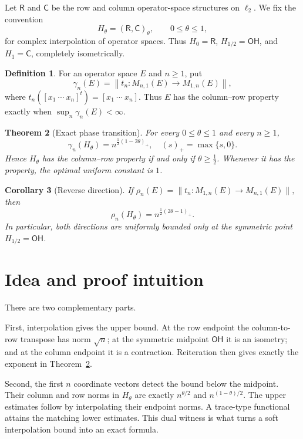 \documentclass[11pt]{article}
\newtheorem{theorem}{Theorem}
\newtheorem{corollary}[theorem]{Corollary}
\theoremstyle{definition}
\newtheorem{definition}[theorem]{Definition}
\newcommand{\Rspace}{\mathsf R}
\newcommand{\Cspace}{\mathsf C}
\newcommand{\OH}{\mathsf{OH}}
\begin{document}
Let \(\Rspace\) and \(\Cspace\) be the row and column operator-space structures
on \(\ell_2\).  We fix the convention
\[
 H_\theta=(\Rspace,\Cspace)_\theta,
 \qquad 0\leq\theta\leq1,
\]
for complex interpolation of operator spaces.  Thus
\(H_0=\Rspace\), \(H_{1/2}=\OH\), and \(H_1=\Cspace\), completely isometrically.

\begin{definition}
For an operator space \(E\) and \(n\geq1\), put
\[
 \gamma_n(E)=
 \left\|t_n:M_{n,1}(E)\longrightarrow M_{1,n}(E)\right\|,
\]
where \(t_n([x_1\ \cdots\ x_n]^t)=[x_1\ \cdots\ x_n]\).
Thus \(E\) has the column--row property exactly when
\(\sup_n\gamma_n(E)<\infty\).
\end{definition}

\begin{theorem}[Exact phase transition]\label{thm:main}
For every \(0\leq\theta\leq1\) and every \(n\geq1\),
\[
 \boxed{\quad
 \gamma_n(H_\theta)=n^{\frac12(1-2\theta)_+},
 \quad (s)_+=\max\{s,0\}.\quad}
\]
Hence \(H_\theta\) has the column--row property if and only if
\(\theta\geq\tfrac12\).  Whenever it has the property, the optimal uniform
constant is \(1\).
\end{theorem}

\begin{corollary}[Reverse direction]\label{cor:reverse}
If
\(
 \rho_n(E)=\|t_n:M_{1,n}(E)\to M_{n,1}(E)\|,
\)
then
\[
 \rho_n(H_\theta)=n^{\frac12(2\theta-1)_+}.
\]
In particular, both directions are uniformly bounded only at the symmetric
point \(H_{1/2}=\OH\).
\end{corollary}

\section{Idea and proof intuition}

There are two complementary parts.

First, interpolation gives the upper bound.  At the row endpoint the
column-to-row transpose has norm \(\sqrt n\); at the symmetric midpoint
\(\OH\) it is an isometry; and at the column endpoint it is a contraction.
Reiteration then gives exactly the exponent in Theorem~\ref{thm:main}.

Second, the first \(n\) coordinate vectors detect the bound below the
midpoint.  Their column and row norms in \(H_\theta\) are exactly
\(n^{\theta/2}\) and \(n^{(1-\theta)/2}\).  The upper estimates follow by
interpolating their endpoint norms.  A trace-type functional attains the
matching lower estimates.  This dual witness is what turns a soft
interpolation bound into an exact formula.
\end{document}
